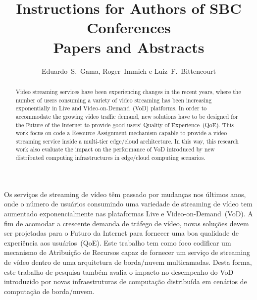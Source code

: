 \documentclass[12pt]{article}
\title{Instructions for Authors of SBC Conferences\\ Papers and Abstracts}
\author{Eduardo~S.~Gama\inst{1}, Roger~Immich\inst{2} e Luiz~F.~Bittencourt\inst{1}}
\begin{document}
\maketitle

\begin{abstract}
Video streaming services have been experiencing changes in the recent years, where the number of users consuming a variety of video streaming has been increasing exponentially in Live and Video-on-Demand~(VoD) platforms. In order to accommodate the growing video traffic demand, new solutions have to be designed for the Future of the Internet to provide good users' Quality of Experience~(QoE). This work focus on code a Resource Assignment mechanism capable to provide a video streaming service inside a multi-tier edge/cloud architecture. In this way, this research work also evaluate the impact on the performance of VoD introduced by new distributed computing infrastructures in edge/cloud computing scenarios.
\end{abstract}
     
\begin{resumo} 
Os serviços de streaming de vídeo têm passado por mudanças nos últimos anos, onde o número de usuários consumindo uma variedade de streaming de vídeo tem aumentado exponencialmente nas plataformas Live e Video-on-Demand~(VoD). A fim de acomodar a crescente demanda de tráfego de vídeo, novas soluções devem ser projetadas para o Futuro da Internet para fornecer uma boa qualidade de experiência aos usuários~(QoE). Este trabalho tem como foco codificar um mecanismo de Atribuição de Recursos capaz de fornecer um serviço de streaming de vídeo dentro de uma arquitetura de borda/nuvem multicamadas. Desta forma, este trabalho de pesquisa também avalia o impacto no desempenho do VoD introduzido por novas infraestruturas de computação distribuída em cenários de computação de borda/nuvem.
\end{resumo}

















\end{document}
